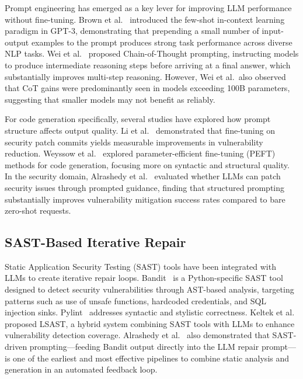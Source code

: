 \documentclass[runningheads]{llncs}
\begin{document}
Prompt engineering has emerged as a key lever for improving LLM performance without fine-tuning. Brown et al.~\cite{brown2020gpt3} introduced the few-shot in-context learning paradigm in GPT-3, demonstrating that prepending a small number of input-output examples to the prompt produces strong task performance across diverse NLP tasks. Wei et al.~\cite{wei2022cot} proposed Chain-of-Thought prompting, instructing models to produce intermediate reasoning steps before arriving at a final answer, which substantially improves multi-step reasoning. However, Wei et al.\ also observed that CoT gains were predominantly seen in models exceeding 100B parameters, suggesting that smaller models may not benefit as reliably.

For code generation specifically, several studies have explored how prompt structure affects output quality. Li et al.~\cite{li2024finetuning} demonstrated that fine-tuning on security patch commits yields measurable improvements in vulnerability reduction. Weyssow et al.~\cite{weyssow2025peft} explored parameter-efficient fine-tuning (PEFT) methods for code generation, focusing more on syntactic and structural quality. In the security domain, Alrashedy et al.~\cite{alrashedy2024canlllms} evaluated whether LLMs can patch security issues through prompted guidance, finding that structured prompting substantially improves vulnerability mitigation success rates compared to bare zero-shot requests.

\subsection{SAST-Based Iterative Repair}

Static Application Security Testing (SAST) tools have been integrated with LLMs to create iterative repair loops. Bandit~\cite{pycqa2014bandit} is a Python-specific SAST tool designed to detect security vulnerabilities through AST-based analysis, targeting patterns such as use of unsafe functions, hardcoded credentials, and SQL injection sinks. Pylint~\cite{pycqa2003pylint} addresses syntactic and stylistic correctness. Keltek et al.~\cite{keltek2024lsast} proposed LSAST, a hybrid system combining SAST tools with LLMs to enhance vulnerability detection coverage. Alrashedy et al.~\cite{alrashedy2024canlllms} also demonstrated that SAST-driven prompting---feeding Bandit output directly into the LLM repair prompt---is one of the earliest and most effective pipelines to combine static analysis and generation in an automated feedback loop.
\end{document}
